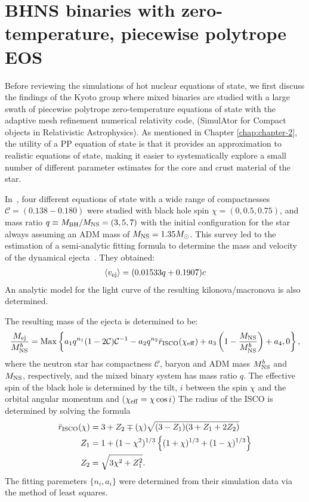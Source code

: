 \section{BHNS binaries with zero-temperature, piecewise polytrope EOS}

Before reviewing the simulations of hot nuclear equations of state, 
we first discuss the findings of the Kyoto group where mixed binaries are studied with a large swath of piecewise polytrope zero-temperature equations of state with the adaptive mesh refinement numerical relativity code, \SACRA (SimulAtor for Compact objects in Relativistic Astrophysics).  
As mentioned in Chapter \ref{chap:chapter-2}, the utility of a PP equation of state is that it provides an approximation to realistic equations of state, making it easier to systematically explore a small number of different parameter estimates for the core and crust material of the star.  

In~\cite{Kyutoku:2013}, four different equations of state with a wide range of compactnesses $\mathcal{C} = (0.138 - 0.180)$ were studied with black hole spin $\chi = (0, 0.5, 0.75)$, and mass ratio $q \equiv M_{\rm BH}/M_{\rm NS} = (3, 5, 7)$ with the initial configuration for the star always assuming an ADM mass of $M_{\rm NS} = 1.35 M_\odot$.
This survey led to the estimation of a semi-analytic fitting formula to determine the mass and velocity of the dynamical ejecta~\cite{Kyutoku:2015}.  They obtained:
\begin{align}
\label{e:vej_sacra}
\left\langle v_{\rm ej} \right\rangle = (0.01533 q + 0.1907) c
\end{align}
An analytic model for the light curve of the resulting kilonova/macronova is also determined.

The resulting mass of the ejecta is determined to be:
\begin{align}
\label{e:mass_ejecta}
\frac{M_{\rm ej}}{M^b_{\rm NS}} = 
{\rm Max} 
\left \{ 
a_1 q^{n_1} (1- 2 \mathcal{C})\mathcal{C}^{-1}
-a_2 q^{n_2} \bar{r}_{\rm ISCO}(\chi_{\rm eff} )
+a_3 \left( 1- \frac{M_{\rm NS}}{M^b_{\rm NS}} \right)
+a_4
,
0
\right \},
\end{align}
where the neutron star has compactness $\mathcal{C}$, baryon and ADM mass $M^b_{\rm NS}$ and $M_{\rm NS}$, respectively, and the mixed binary system has mass ratio $q$.
The effective spin of the black hole is determined by the tilt, $i$ between the spin $\chi$ and the orbital angular momentum and ($\chi_{\rm eff} = \chi \cos i$)
The radius of the ISCO is determined by solving the formula
\begin{align}
\label{e:isco_r}
\bar{r}_{\rm ISCO}(\chi) &=
3+Z_2
\mp (\chi)
\sqrt{(3 - Z_1) (3 + Z_1 + 2 Z_2)} \\
\label{e:isco_z1}
Z_1 &= 
1 + (1 - \chi^2)^{1/3}
\left \{ 
(1 + \chi)^{1/3} + (1 - \chi)^{1/3}
\right \}  \\
\label{e:isco_z2}
Z_2 &= \sqrt{3 \chi^2 + Z_1^2}.
\end{align}
The fitting paremeters $\{n_i,a_i\}$ were determined from their simulation data via the method of least squares.

